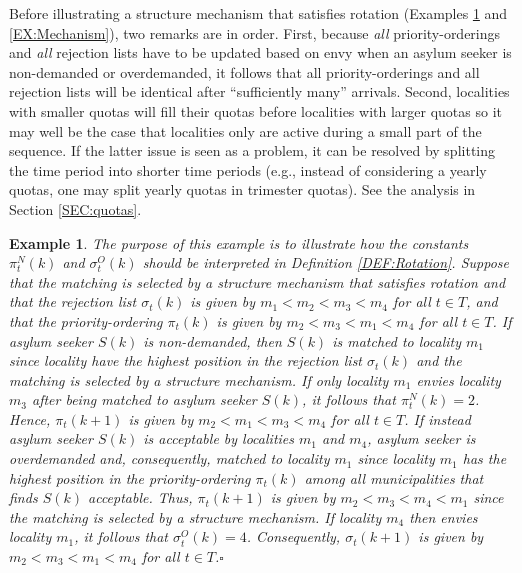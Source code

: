 \documentclass[12pt,fleqn]{article}
\newtheorem{example}{Example}
\begin{document}
\noindent Before illustrating a structure mechanism that satisfies rotation (Examples \ref{EX:Rotation} and \ref{EX:Mechanism}), two remarks are in order. First, because \emph{all} priority-orderings and \emph{all} rejection lists have to be updated based on envy when an asylum seeker is non-demanded or overdemanded, it follows that all priority-orderings and all rejection lists will be identical after ``sufficiently many'' arrivals. Second, localities with smaller quotas will fill their quotas before localities with larger quotas so it may well be the case that localities only are active during a small part of the sequence. If the latter issue is seen as a problem, it can be resolved by splitting the time period into shorter time periods (e.g., instead of considering a yearly quotas, one may split yearly quotas in trimester quotas). See the analysis in Section \ref{SEC:quotas}.

\begin{example}\rm\label{EX:Rotation}
The purpose of this example is to illustrate how the constants $\pi^{N}_t(k)$ and $\sigma^{O}_t(k)$ should be interpreted in Definition \ref{DEF:Rotation}. Suppose that the matching is selected by a structure mechanism that satisfies rotation and that the rejection list $\sigma_t(k)$ is given by $m_1<m_2<m_3<m_4$ for all $t\in T$, and that the priority-ordering $\pi_t(k)$ is given by $m_2<m_3<m_1<m_4$ for all $t\in T$. If asylum seeker $S(k)$ is non-demanded, then $S(k)$ is matched to locality $m_1$ since locality have the highest position in the rejection list $\sigma_t(k)$ and the matching is selected by a structure mechanism. If only locality $m_1$ envies locality $m_3$ after being matched to asylum seeker $S(k)$, it follows that $\pi^{N}_t(k)=2$. Hence, $\pi_t(k+1)$ is given by $m_2<m_1<m_3<m_4$ for all $t\in T$. If instead asylum seeker $S(k)$ is acceptable by localities $m_1$ and $m_4$, asylum seeker is overdemanded and, consequently, matched to locality $m_1$ since locality $m_1$ has the highest position in the priority-ordering $\pi_t(k)$ among all municipalities that finds $S(k)$ acceptable. Thus, $\pi_t(k+1)$ is given by $m_2<m_3<m_4<m_1$ since the matching is selected by a structure mechanism. If locality $m_4$ then envies locality $m_1$, it follows that $\sigma^{O}_t(k)=4$. Consequently, $\sigma_t(k+1)$ is given by $m_2<m_3<m_1<m_4$ for all $t\in T$.\hfill $\square$
\end{example}
\end{document}
